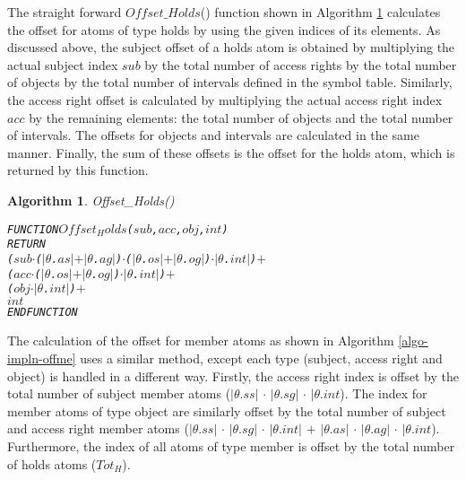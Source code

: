 \documentclass[11pt]{report}
\newenvironment{vverbatim}
{
  \begin{alltt}
}
{
    \vspace{-\baselineskip}
  \end{alltt}
}
\newtheorem{vvalgorithm}{Algorithm}[chapter]
\newenvironment{valgorithm}[2]
{
  \begin{vvalgorithm}{#1}
    \label{#2}
    \small
    \begin{vverbatim}
}
{
    \end{vverbatim}
  \end{vvalgorithm}
}
\begin{document}
        The straight forward $Offset\_Holds$() function shown in Algorithm
        \ref{algo-impln-offho} calculates the offset for atoms of type
        holds by using the given indices of its elements. As discussed
        above, the subject offset of a holds atom is obtained by multiplying
        the actual subject index $sub$ by the total number of access rights
        by the total number of objects by the total number of intervals
        defined in the symbol table. Similarly, the access right offset is
        calculated by multiplying the actual access right index $acc$ by the
        remaining elements: the total number of objects and the total number
        of intervals. The offsets for objects and intervals are calculated
        in the same manner. Finally, the sum of these offsets is the offset
        for the holds atom, which is returned by this function.

        \begin{valgorithm}{Offset\_Holds()}{algo-impln-offho}
FUNCTION \(Offset_Holds\)(\(sub\), \(acc\), \(obj\), \(int\))
  RETURN
    (\(sub\) \(\cdot\) (\(|\)\(\theta\).\(as\)\(|\) \(+\) \(|\)\(\theta\).\(ag\)\(|\)) \(\cdot\) (\(|\)\(\theta\).\(os\)\(|\) \(+\) \(|\)\(\theta\).\(og\)\(|\)) \(\cdot\) \(|\)\(\theta\).\(int\)\(|\)) \(+\)
    (\(acc\) \(\cdot\) (\(|\)\(\theta\).\(os\)\(|\) \(+\) \(|\)\(\theta\).\(og\)\(|\)) \(\cdot\) \(|\)\(\theta\).\(int\)\(|\)) \(+\)
    (\(obj\) \(\cdot\) \(|\)\(\theta\).\(int\)\(|\)) \(+\)
    \(int\)
ENDFUNCTION
        \end{valgorithm}

        The calculation of the offset for member atoms as shown in Algorithm
         \ref{algo-impln-offme} uses a similar method, except each type
        (subject, access right and object) is handled in a different way.
        Firstly, the access right index is offset by the total number of
        subject member atoms ($|$$\theta$.$ss$$|$ $\cdot$ $|$$\theta$.$sg$$|$
        $\cdot$ $|$$\theta$.$int$). The index for member atoms of type object
        are similarly offset by the total number of subject and access right
        member atoms ($|$$\theta$.$ss$$|$ $\cdot$ $|$$\theta$.$sg$$|$
        $\cdot$ $|$$\theta$.$int$$|$ $+$ $|$$\theta$.$as$$|$ $\cdot$
        $|$$\theta$.$ag$$|$ $\cdot$ $|$$\theta$.$int$). Furthermore, the
        index of all atoms of type member is offset by the total number of
        holds atoms ($Tot_H$).
\end{document}
